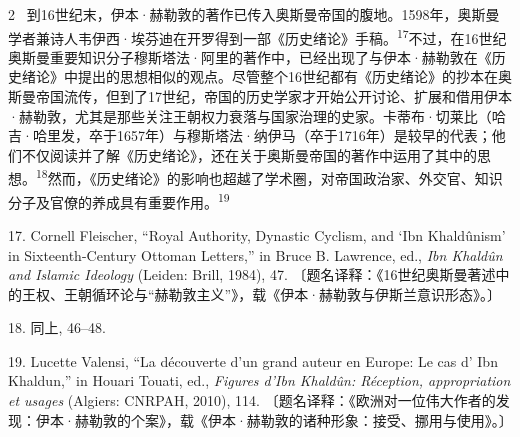 \documentclass[10pt,a4paper]{article}
\begin{document}
\begin{paracol}{2}
\switchcolumn*
{\scriptsize\color{gray} [p. 4]}\ 到16世纪末，伊本·赫勒敦的著作已传入奥斯曼帝国的腹地。1598年，奥斯曼学者兼诗人韦伊西·埃芬迪在开罗得到一部《历史绪论》手\mbox{稿。\textsuperscript{17}}不过，在16世纪奥斯曼重要知识分子穆斯塔法·阿里的著作中，已经出现了与伊本·赫勒敦在《历史绪论》中提出的思想相似的观点。尽管整个16世纪都有《历史绪论》的抄本在奥斯曼帝国流传，但到了17世纪，帝国的历史学家才开始公开讨论、扩展和借用伊本·赫勒敦，尤其是那些关注王朝权力衰落与国家治理的史家。卡蒂布·切莱比（哈吉·哈里发，卒于1657年）与穆斯塔法·纳伊马（卒于1716年）是较早的代表；他们不仅阅读并了解《历史绪论》，还在关于奥斯曼帝国的著作中运用了其中的思\mbox{想。\textsuperscript{18}}然而，《历史绪论》的影响也超越了学术圈，对帝国政治家、外交官、知识分子及官僚的养成具有重要作\mbox{用。\textsuperscript{19}}\par{\small 17. Cornell Fleischer, “Royal Authority, Dynastic Cyclism, and ‘Ibn Khaldûnism’ in Sixteenth-Century Ottoman Letters,” in Bruce B. Lawrence, ed., \textit{Ibn Khaldûn and Islamic Ideology} (Leiden: Brill, 1984), 47. 〔题名译释：《16世纪奥斯曼著述中的王权、王朝循环论与“赫勒敦主义”》，载《伊本·赫勒敦与伊斯兰意识形态》。〕\par}{\small 18. 同上, 46–48.\par}{\small 19. Lucette Valensi, “La découverte d’un grand auteur en Europe: Le cas d’ Ibn Khaldun,” in Houari Touati, ed., \textit{Figures d’Ibn Khaldûn: Réception, appropriation et usages} (Algiers: CNRPAH, 2010), 114. 〔题名译释：《欧洲对一位伟大作者的发现：伊本·赫勒敦的个案》，载《伊本·赫勒敦的诸种形象：接受、挪用与使用》。〕\par}
\switchcolumn

\end{paracol}
\end{document}
